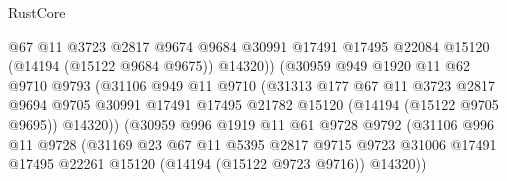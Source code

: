 \begin{lexlean}{RustCore}
\begin{coremodule}
                                @67
                                @11
                                @3723
                                @2817
                                @9674
                                @9684
                                @30991
                                @17491
                                @17495
                                @22084
                                @15120
                                (@14194 (@15122 @9684 @9675))
                                @14320))
                            (@30959
                              @949
                              @1920
                              @11
                              @62
                              @9710
                              @9793
                              (@31106
                                @949
                                @11
                                @9710
                                (@31313
                                  @177
                                  @67
                                  @11
                                  @3723
                                  @2817
                                  @9694
                                  @9705
                                  @30991
                                  @17491
                                  @17495
                                  @21782
                                  @15120
                                  (@14194 (@15122 @9705 @9695))
                                  @14320))
                              (@30959
                                @996
                                @1919
                                @11
                                @61
                                @9728
                                @9792
                                (@31106
                                  @996
                                  @11
                                  @9728
                                  (@31169
                                    @23
                                    @67
                                    @11
                                    @5395
                                    @2817
                                    @9715
                                    @9723
                                    @31006
                                    @17491
                                    @17495
                                    @22261
                                    @15120
                                    (@14194 (@15122 @9723 @9716))
                                    @14320))

\end{coremodule}
\end{lexlean}
